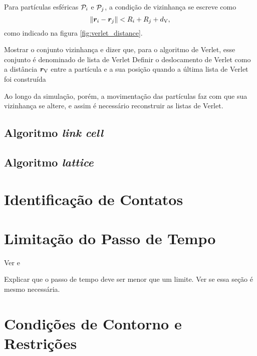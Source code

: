 Para partículas esféricas \({\mathcal{P}}_{i}\) e \({\mathcal{P}}_{j}\), a condição de vizinhança se escreve como
\begin{equation*}
	\norm{{\bm{r}}_{i} - {\bm{r}}_{j}} < {R}_{i} + {R}_{j} + d_{\text{V}},
\end{equation*}
como indicado na figura \ref{fig:verlet_distance}. 

\alert{Mostrar o conjunto vizinhança e dizer que, para o algoritmo de Verlet, esse conjunto é denominado de lista de Verlet}
\alert{Definir o deslocamento de Verlet como a distância \(\bm{r}_{\text{V}}\) entre a partícula e a sua posição quando a última lista de Verlet foi construída}


Ao longo da simulação, porém, a movimentação das partículas faz com que sua vizinhança se altere, e assim é necessário reconstruir as listas de Verlet.

\subsection{Algoritmo \textit{link cell}}
\subsection{Algoritmo \textit{lattice}}

\section{Identificação de Contatos}

\section{Limitação do Passo de Tempo}

\alert{Ver  e }

\alert{Explicar que o passo de tempo deve ser menor que um limite. Ver se essa seção é mesmo necessária.}

\section{Condições de Contorno e Restrições} \label{sec:boundary_condition}

